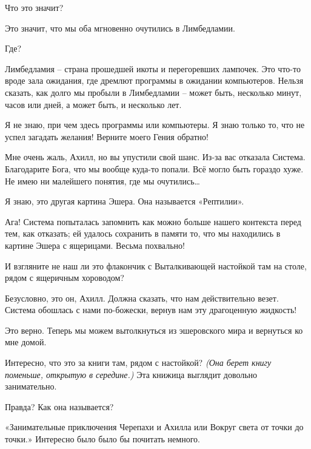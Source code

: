 \documentclass[../main.tex]{subfiles}
\begin{document}
\begin{Dialogue}
\begin{sublevel}
\begin{sublevel}
 Что это значит?

 Это значит, что мы оба мгновенно очутились в Лимбедламии.

 Где?

 Лимбедламия \--- страна прошедшей икоты и перегоревших лампочек. Это что-то вроде зала ожидания, где дремлют программы в ожидании компьютеров. Нельзя сказать, как долго мы пробыли в Лимбедламии \--- может быть, несколько минут, часов или дней, а может быть, и несколько лет.

 Я не знаю, при чем здесь программы или компьютеры. Я знаю только то, что не успел загадать желания! Верните моего Гения обратно!

 Мне очень жаль, Ахилл, но вы упустили свой шанс. Из-за вас отказала Система. Благодарите Бога, что мы вообще куда-то попали. Всё могло быть гораздо хуже. Не имею ни малейшего понятия, где мы очутились\ldots{}

 Я знаю, это другая картина Эшера. Она называется «Рептилии».

 Ага! Система попыталась запомнить как можно больше нашего контекста перед тем, как отказать; ей удалось сохранить в памяти то, что мы находились в картине Эшера с ящерицами. Весьма похвально!


 И взгляните не наш ли это флакончик с Выталкивающей настойкой там на столе, рядом с ящеричным хороводом?

 Безусловно, это он, Ахилл. Должна сказать, что нам действительно везет. Система обошлась с нами по-божески, вернув нам эту драгоценную жидкость!

 Это верно. Теперь мы можем вытолкнуться из эшеровского мира и вернуться ко мне домой.

 Интересно, что это за книги там, рядом с настойкой? \emph{(Она берет книгу поменьше, открытую в середине.)} Эта книжица выглядит довольно занимательно.

 Правда? Как она называется?

 «Занимательные приключения Черепахи и Ахилла или Вокруг света от точки до точки.» Интересно было было бы почитать немного.


\end{sublevel}
\end{sublevel}
\end{Dialogue}
\end{document}
